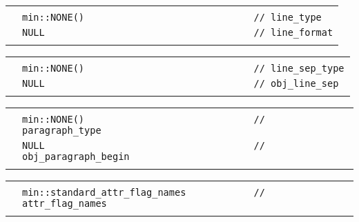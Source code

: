 \documentclass[12pt]{article}
\newenvironment{indpar}[1][0.3in]%
	{\begin{list}{}%
		     {\setlength{\itemsep}{0in}%
		      \setlength{\topsep}{0in}%
		      \setlength{\parsep}{1ex}%
		      \setlength{\labelwidth}{#1}%
		      \setlength{\leftmargin}{#1}%
		      \addtolength{\leftmargin}{\labelsep}}%
	 \item}%
	{\end{list}}
\newlength{\ARGBREAKLENGTH}
\newcommand{\ARGBREAK}[1][\ARGBREAKLENGTH]{\\&\hspace*{#1}}
\begin{document}
\begin{indpar}[1em]
\vspace{-4ex}\begin{tabular}{r@{}l}\hspace*{0.1in}\ARGBREAK
\verb|min::NONE()                              // line_type|\ARGBREAK
\verb|NULL                                     // line_format|\ARGBREAK
\end{tabular}

\vspace{-4ex}\begin{tabular}{r@{}l}\hspace*{0.1in}\ARGBREAK
\verb|min::NONE()                              // line_sep_type|\ARGBREAK
\verb|NULL                                     // obj_line_sep|\ARGBREAK
\end{tabular}

\vspace{-4ex}\begin{tabular}{r@{}l}\hspace*{0.1in}\ARGBREAK
\verb|min::NONE()                              // paragraph_type|\ARGBREAK
\verb|NULL                                     // obj_paragraph_begin|\ARGBREAK
\end{tabular}

\vspace{-4ex}\begin{tabular}{r@{}l}\hspace*{0.1in}\ARGBREAK
\verb|min::standard_attr_flag_names            // attr_flag_names|\ARGBREAK
\end{tabular}\end{indpar}
\end{document}
